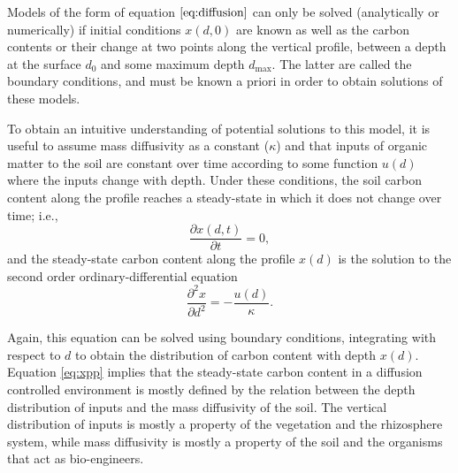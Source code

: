 \documentclass[11pt, oneside, a4paper]{article}   	%
\begin{document}
Models of the form of equation $\ref{eq:diffusion}$ can only be solved (analytically or numerically) if initial conditions $x(d, 0)$ are known as well as the carbon contents or their change at two points along the vertical profile, between a depth at the surface $d_0$ and some maximum depth $d_{\max}$. The latter  are called the boundary conditions, and must be known a priori in order to obtain solutions of these models. 

To obtain an intuitive understanding of potential solutions to this model, it is useful to assume mass diffusivity as a constant ($\kappa$) and that inputs of organic matter to the soil are constant over time according to some function $u(d)$ where the inputs change with depth. Under these conditions, the soil carbon content along the profile reaches a steady-state in which it does not change over time; i.e.,
$$
\frac{\partial x(d, t)}{\partial t} = 0, 
$$
and the steady-state carbon content along the profile $x(d)$ is the solution to the second order ordinary-differential equation
\begin{equation} \label{eq:xpp}
\frac{\partial^2 x}{\partial d^2} = - \frac{u(d)}{\kappa}.
\end{equation}

Again, this equation can be solved using boundary conditions, integrating with respect to $d$ to obtain the distribution of carbon content with depth $x(d)$. Equation \ref{eq:xpp} implies that the steady-state carbon content in a diffusion controlled environment is mostly defined by the relation between the depth distribution of inputs and the mass diffusivity of the soil. The vertical distribution of inputs is mostly a property of the vegetation and the rhizosphere system, while mass diffusivity is mostly a property of the soil and the organisms that act as bio-engineers. 
\end{document}

